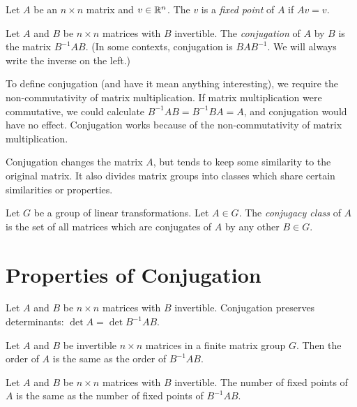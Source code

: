 \documentclass[fleqn]{report}
\begin{document}
\begin{defn}
Let $A$ be an $n \times n$ matrix and $v \in \mathbb{R}^n$. The $v$
is a \emph{fixed point} of $A$ if $Av = v$.
\end{defn}

\begin{defn}
Let $A$ and $B$ be $n \times n$ matrices with $B$ invertible.
The \emph{conjugation} of $A$ by $B$ is the matrix $B^{-1}AB$. 
(In some contexts, conjugation is $BAB^{-1}$. We
will always write the inverse on the left.)
\end{defn}

To define conjugation (and have it mean anything interesting),
we require the non-commutativity of matrix multiplication. If
matrix multiplication were commutative, we could calculate
$B^{-1}AB = B^{-1}BA = A$, and conjugation would have no
effect. Conjugation works because of the non-commutativity of
matrix multiplication.

Conjugation changes the matrix $A$, but tends to keep some
similarity to the original matrix. It also divides matrix
groups into classes which share certain similarities or
properties.

\begin{defn}
Let $G$ be a group of linear transformations. Let $A \in G$.
The \emph{conjugacy class} of $A$ is the set of all matrices
which are conjugates of $A$ by any other $B \in G$.
\end{defn}

\section{Properties of Conjugation}

\begin{prop}
Let $A$ and $B$ be $n \times n$ matrices with $B$ invertible.
Conjugation preserves determinants: $\det A = \det
B^{-1}AB$.
\end{prop}

\begin{prop}
Let $A$ and $B$ be invertible $n \times n$ matrices in a
finite matrix group $G$. Then the order of
$A$ is the same as the order of $B^{-1}AB$.
\end{prop}

\begin{prop}
Let $A$ and $B$ be $n \times n$ matrices with $B$ invertible.
The number of fixed points of $A$ is the same as the number of
fixed points of $B^{-1}AB$. 
\end{prop}
\end{document}
